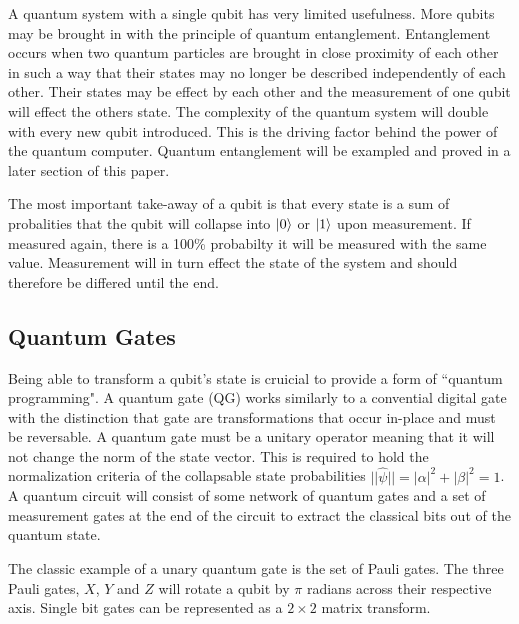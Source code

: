 \documentclass[conference]{IEEEtran}
\begin{document}
A quantum system with a single qubit has very limited usefulness. More qubits may be brought in with the principle of quantum entanglement. Entanglement occurs when two quantum particles are brought in close proximity of each other in such a way that their states may no longer be described independently of each other. Their states may be effect by each other and the measurement of one qubit will effect the others state. The complexity of the quantum system will double with every new qubit introduced. This is the driving factor behind the power of the quantum computer. Quantum entanglement will be exampled and proved in a later section of this paper.

The most important take-away of a qubit is that every state is a sum of probalities that the qubit will collapse into $\ket{0}$ or $\ket{1}$ upon measurement. If measured again, there is a 100\% probabilty it will be measured with the same value. Measurement will in turn effect the state of the system and should therefore be differed until the end.

\subsection{Quantum Gates}

Being able to transform a qubit's state is cruicial to provide a form of ``quantum programming". A quantum gate (QG) works similarly to a convential digital gate with the distinction that gate are transformations that occur in-place and must be reversable. A quantum gate must be a unitary operator meaning that it will not change the norm of the state vector. This is required to hold the normalization criteria of the collapsable state probabilities $||\hat{\psi}|| = |\alpha|^2 + |\beta|^2 = 1$. A quantum circuit will consist of some network of quantum gates and a set of measurement gates at the end of the circuit to extract the classical bits out of the quantum state.

The classic example of a unary quantum gate is the set of Pauli gates. The three Pauli gates, $X$, $Y$ and $Z$ will rotate a qubit by $\pi$ radians across their respective axis. Single bit gates can be represented as a $2 \times 2$ matrix transform.
\end{document}
